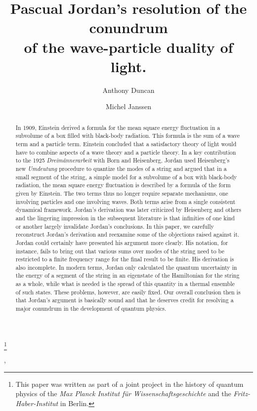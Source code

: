 \documentclass{elsart}
\begin{document}
\begin{frontmatter}


\title{Pascual Jordan's resolution of the conundrum \\ of the wave-particle
duality of light.}
\thanks[mpiwg]{This paper was written as part of a joint project in the history of quantum physics of the {\it Max Planck Institut f\"{u}r Wissenschaftsgeschichte} and the {\it Fritz-Haber-Institut} in Berlin.}


\author[duncan]{Anthony Duncan},
\author[janssen]{Michel Janssen}
\address[duncan]{Department of Physics and Astronomy, University of Pittsburgh}
\address[janssen]{Program in the History of Science, Technology, and Medicine, \\ University of Minnesota}

\begin{abstract}
In 1909, Einstein derived a formula for the mean square energy fluctuation in a subvolume of a box filled with black-body radiation. This formula is the sum of a wave term and a particle term. Einstein concluded that a satisfactory theory of light would have to combine aspects of a wave theory and a particle theory. In a key contribution to the 1925 {\it Dreim\"annerarbeit} with Born and Heisenberg, Jordan used Heisenberg's new {\it Umdeutung} procedure to quantize the modes of a string and argued that in a small segment of the string, a simple model for a subvolume of a box with black-body radiation, the mean square energy fluctuation is described by a formula of the form given by Einstein. The two terms thus no longer require separate mechanisms, one involving particles and one involving waves. Both terms arise from a single consistent dynamical framework. Jordan's derivation was later criticized by Heisenberg and others and the lingering impression in the subsequent literature is that infinities of one kind or another largely invalidate Jordan's conclusions. In this paper, we carefully reconstruct Jordan's derivation and reexamine some of the objections raised against it. Jordan could certainly have presented his argument more clearly. His notation, for instance, fails to bring out that various sums over modes of the string need to be restricted to a finite frequency range for the final result to be finite. His derivation is also incomplete. In modern terms, Jordan only calculated the quantum uncertainty in the energy of a segment of the string in an eigenstate of the Hamiltonian for the string as a whole, while what is needed is the spread of this quantity in a thermal ensemble of such states. These problems, however, are easily fixed. Our overall conclusion then is that Jordan's argument is basically sound and that he deserves credit for resolving a major conundrum in the development of quantum physics.
\end{abstract}


\end{frontmatter}
\end{document}
